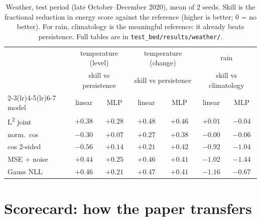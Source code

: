 \documentclass[11pt]{article}
\newcommand{\Ltwo}{L\textsuperscript{2}}
\begin{document}
\begin{table}[h]
\centering
\small
\begin{tabular}{@{}lcccccc@{}}
\toprule
& \multicolumn{2}{c}{temperature (level)} & \multicolumn{2}{c}{temperature (change)} & \multicolumn{2}{c}{rain} \\
& \multicolumn{2}{c}{skill vs persistence} & \multicolumn{2}{c}{skill vs persistence} & \multicolumn{2}{c}{skill vs climatology} \\
\cmidrule(lr){2-3}\cmidrule(lr){4-5}\cmidrule(lr){6-7}
model & linear & MLP & linear & MLP & linear & MLP \\
\midrule
\Ltwo{} joint   & $+0.38$ & $\mathbf{+0.28}$ & $\mathbf{+0.48}$ & $\mathbf{+0.46}$ & $\mathbf{+0.01}$ & $-0.04$ \\
norm.\ cos      & $-0.30$ & $+0.07$ & $+0.27$ & $+0.38$ & $-0.00$ & $-0.06$ \\
cos 2-sided     & $-0.56$ & $+0.14$ & $+0.21$ & $+0.42$ & $-0.92$ & $-1.04$ \\
MSE + noise     & $+0.44$ & $+0.25$ & $+0.46$ & $+0.41$ & $-1.02$ & $-1.44$ \\
Gauss NLL       & $\mathbf{+0.46}$ & $+0.21$ & $+0.47$ & $+0.41$ & $-1.16$ & $-0.67$ \\
\bottomrule
\end{tabular}
\caption{Weather, test period (late October--December 2020), mean of 2 seeds. Skill is
the fractional reduction in energy score against the reference (higher is better; 0 = no
better). For rain, climatology is the meaningful reference: it already beats persistence.
Full tables are in \texttt{test\_bed/results/weather/}.}
\label{tab:weather}
\end{table}

\section{Scorecard: how the paper transfers}
\end{document}

